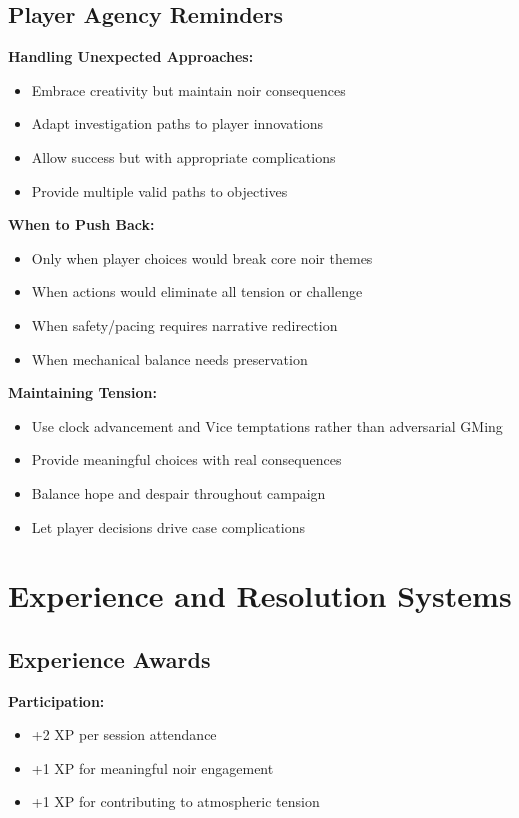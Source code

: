 \documentclass[11pt]{article}
\begin{document}
\subsection{Player Agency Reminders}

\textbf{Handling Unexpected Approaches:}
\begin{itemize}
\item Embrace creativity but maintain noir consequences
\item Adapt investigation paths to player innovations
\item Allow success but with appropriate complications
\item Provide multiple valid paths to objectives
\end{itemize}

\textbf{When to Push Back:}
\begin{itemize}
\item Only when player choices would break core noir themes
\item When actions would eliminate all tension or challenge
\item When safety/pacing requires narrative redirection
\item When mechanical balance needs preservation
\end{itemize}

\textbf{Maintaining Tension:}
\begin{itemize}
\item Use clock advancement and Vice temptations rather than adversarial GMing
\item Provide meaningful choices with real consequences
\item Balance hope and despair throughout campaign
\item Let player decisions drive case complications
\end{itemize}

\section{Experience and Resolution Systems}

\subsection{Experience Awards}

\textbf{Participation:}
\begin{itemize}
\item +2 XP per session attendance
\item +1 XP for meaningful noir engagement
\item +1 XP for contributing to atmospheric tension
\end{itemize}
\end{document}
